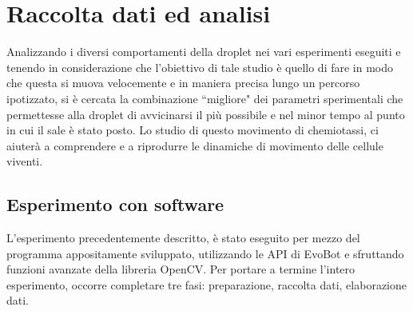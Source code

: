 \chapter{Raccolta dati ed analisi}
\vspace{0.5cm}
\label{cha:789}

Analizzando i diversi comportamenti della droplet nei vari esperimenti eseguiti e tenendo in considerazione che l'obiettivo di tale studio è quello di fare in modo che questa si muova velocemente e in maniera precisa lungo un percorso ipotizzato, si è cercata la combinazione ``migliore" dei parametri sperimentali che permettesse alla droplet di avvicinarsi il più possibile e nel minor tempo al punto in cui il sale è stato posto. Lo studio di questo movimento di chemiotassi, ci aiuterà a comprendere e a riprodurre le dinamiche di movimento delle cellule viventi.

\section{Esperimento con software}
L'esperimento precedentemente descritto, è stato eseguito per mezzo del programma appositamente sviluppato, utilizzando le API di EvoBot e sfruttando funzioni avanzate della libreria OpenCV. Per portare a termine l'intero esperimento, occorre completare tre fasi: preparazione, raccolta dati, elaborazione dati. 

